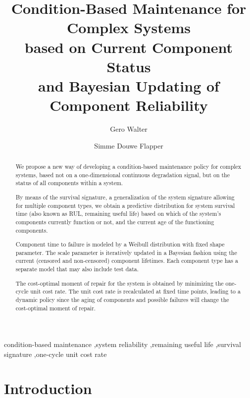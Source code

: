 \documentclass[authoryear]{elsarticle}
\begin{document}

\begin{frontmatter}
\title{Condition-Based Maintenance for Complex Systems\\ based on Current Component Status\\ and Bayesian Updating of Component Reliability}

\author[tue]{Gero Walter}
\author[tue]{Simme Douwe Flapper}

\address[tue]{School of Industrial Engineering, Eindhoven University of Technology, Eindhoven, Netherlands}


\begin{abstract}
We propose a new way of developing a condition-based maintenance policy for complex systems,
based not on a one-dimensional continuous degradation signal,
but on the status of all components within a system.

By means of the survival signature,
a generalization of the system signature allowing for multiple component types,
we obtain a predictive distribution for system survival time
(also known as RUL, remaining useful life)
based on which of the system's components currently function or not,
and the current age of the functioning components.

Component time to failure is modeled by a Weibull distribution with fixed shape parameter.
The scale parameter is iteratively updated in a Bayesian fashion
using the current (censored and non-censored) component lifetimes.
Each component type has a separate model that may also include test data.

The cost-optimal moment of repair for the system is obtained by minimizing the one-cycle unit cost rate.
The unit cost rate is recalculated at fixed time points,
leading to a dynamic policy since the aging of components and possible failures will change the cost-optimal moment of repair.
\end{abstract}

\begin{keyword}
condition-based maintenance \sep system reliability \sep remaining useful life \sep survival signature \sep one-cycle unit cost rate\end{keyword}
\end{frontmatter}



\section{Introduction}
\label{intro}
\end{document}
